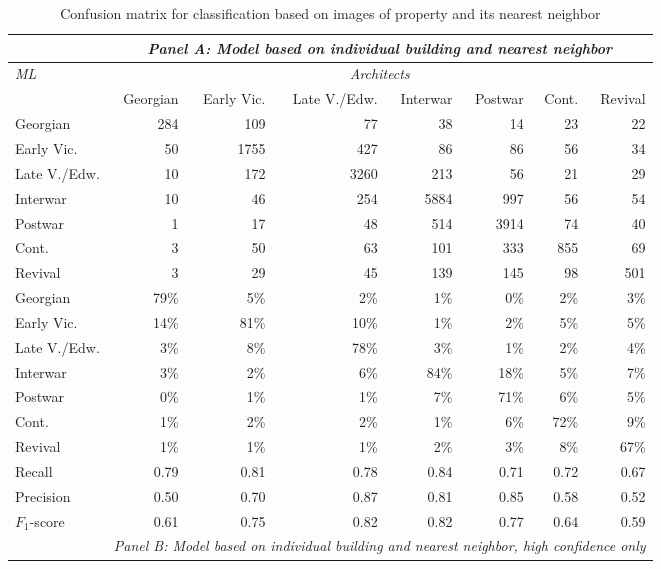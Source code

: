 \begin{table}[!htb]
	\caption{Confusion matrix for classification based on images of property and its nearest neighbor}
	\label{tab:confmat}
	\centering
\begingroup\footnotesize
	\emph{}
\begin{tabular}{lrrrrrrr}
	& \multicolumn{7}{c}{\rule{0pt}{4ex}    \emph{Panel A: Model based on individual building and nearest neighbor} \rule{0pt}{4ex}    }\\
	\toprule
	\emph{ML} & \multicolumn{7}{c}{\emph{Architects}} \\
	\cmidrule(lr){2-8}
	& Georgian & Early Vic. & Late V./Edw. & Interwar & Postwar & Cont. & Revival \\
  \cmidrule(lr){1-1}
\cmidrule(lr){2-8}
	Georgian & 284 & 109 & 77 & 38 & 14 & 23 & 22 \\
	  Early Vic. & 50 & 1755 & 427 & 86 & 86 & 56 & 34 \\
	  Late V./Edw. & 10 & 172 & 3260 & 213 & 56 & 21 & 29 \\
	  Interwar & 10 & 46 & 254 & 5884 & 997 & 56 & 54 \\
	  Postwar & 1 & 17 & 48 & 514 & 3914 & 74 & 40 \\
	  Cont. & 3 & 50 & 63 & 101 & 333 & 855 & 69 \\
	  Revival & 3 & 29 & 45 & 139 & 145 & 98 & 501 \\
		\cmidrule(lr){1-1}
\cmidrule(lr){2-8}
	  Georgian & 79\% & 5\% & 2\% & 1\% & 0\% & 2\% & 3\% \\
	  Early Vic. & 14\% & 81\% & 10\% & 1\% & 2\% & 5\% & 5\% \\
	  Late V./Edw. & 3\% & 8\% & 78\% & 3\% & 1\% & 2\% & 4\% \\
	  Interwar & 3\% & 2\% & 6\% & 84\% & 18\% & 5\% & 7\% \\
	  Postwar & 0\% & 1\% & 1\% & 7\% & 71\% & 6\% & 5\% \\
	  Cont. & 1\% & 2\% & 2\% & 1\% & 6\% & 72\% & 9\% \\
	  Revival & 1\% & 1\% & 1\% & 2\% & 3\% & 8\% & 67\% \\
		\cmidrule(lr){1-1}
\cmidrule(lr){2-8}
	  Recall & 0.79 & 0.81 & 0.78 & 0.84 & 0.71 & 0.72 & 0.67 \\
	  Precision & 0.50 & 0.70 & 0.87 & 0.81 & 0.85 & 0.58 & 0.52 \\
	  $F_1$-score & 0.61 & 0.75 & 0.82 & 0.82 & 0.77 & 0.64 & 0.59 \\

		\cmidrule(lr){1-1} \cmidrule(lr){2-8}
		& \multicolumn{7}{c}{ \emph{ Panel B: Model based on individual building and nearest neighbor, high confidence only} \rule{0pt}{4ex}    }\\
		\cmidrule(lr){1-1} \cmidrule(lr){2-8}


\end{tabular}
\end{table}
